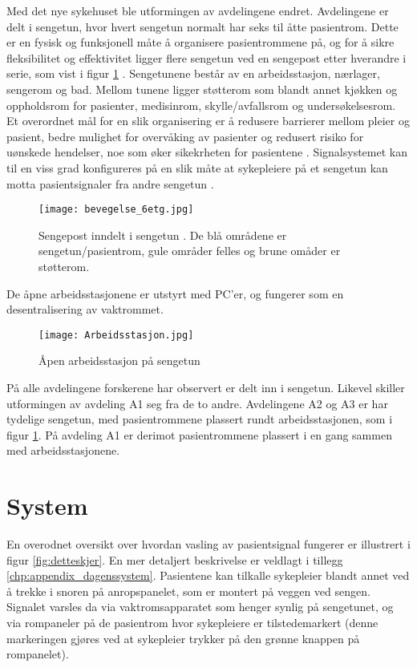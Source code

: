 \noindent
Med det nye sykehuset ble utformingen av avdelingene endret. 
Avdelingene er delt i sengetun, hvor hvert sengetun normalt har seks til åtte pasientrom. Dette er en fysisk og funksjonell måte å organisere pasientrommene på, og for å sikre fleksibilitet og effektivitet ligger flere sengetun ved en sengepost etter hverandre i serie, som vist i figur \ref{fig:sengepost} \citep{Aslaksen, sykehuskart}. Sengetunene består av en arbeidsstasjon, nærlager, sengerom og bad. Mellom tunene ligger støtterom som blandt annet kjøkken og oppholdsrom for pasienter, medisinrom, skylle/avfallsrom og undersøkelsesrom. Et overordnet mål for en slik organisering er å redusere barrierer mellom pleier og pasient, bedre mulighet for overvåking av pasienter og redusert risiko for uønskede hendelser, noe som øker sikekrheten for pasientene \citep{Sintef-sengetun}.
Signalsystemet kan til en viss grad konfigureres på en slik måte at sykepleiere på et sengetun kan motta pasientsignaler fra andre sengetun \citep{Aslaksen}. 

\begin{figure}[H]
\centering
\texttt{[image: bevegelse\_6etg.jpg]}
\caption{Sengepost inndelt i sengetun \citep{sykehuskart}. De blå områdene er sengetun/pasientrom, gule områder felles og brune omåder er støtterom.}
\label{fig:sengepost}
\end{figure}

\noindent
De åpne arbeidsstasjonene er utstyrt med PC'er, og fungerer som en desentralisering av vaktrommet. 

\begin{figure}[H]
\centering
\texttt{[image: Arbeidsstasjon.jpg]}
\caption{Åpen arbeidsstasjon på sengetun \citep{sykehuskart}}
\label{fig:arbeidsstasjon}
\end{figure}

\noindent
På alle avdelingene forskerene har observert er delt inn i sengetun. Likevel skiller utformingen av avdeling A1 seg fra de to andre.
Avdelingene A2 og A3 er har tydelige sengetun, med pasientrommene plassert rundt arbeidsstasjonen, som i figur \ref{fig:sengepost}. På avdeling A1 er derimot pasientrommene plassert i en gang sammen med arbeidsstasjonene. 


\section{System}
En overodnet oversikt over hvordan vasling av pasientsignal fungerer er illustrert i figur \ref{fig:detteskjer}. En mer detaljert beskrivelse er veldlagt i tillegg \ref{chp:appendix_dagenssystem}.
Pasientene kan tilkalle sykepleier blandt annet ved å trekke i snoren på anropspanelet, som er montert på veggen ved sengen. Signalet varsles da via vaktromsapparatet som henger synlig på sengetunet, og via rompaneler på de pasientrom hvor sykepleiere er tilstedemarkert (denne markeringen gjøres ved at sykepleier trykker på den grønne knappen på rompanelet). 

